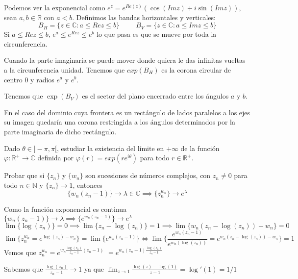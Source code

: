 \begin{sol}

Podemos ver la exponencial como $e^z = e^{Re(z)} (\cos(Imz) + i\sin(Imz))$, sean $a,b\in\mathbb{R}$ con $a<b$.
Definimos las bandas horizontales y verticales:
$$B_H = \{ z\in\mathbb{C} : a\leq Rez \leq b \} \hspace{1cm} B_V = \{ z\in\mathbb{C} : a\leq Imz \leq b \}$$
Si $a\leq Rez \leq b$, $e^a \leq e^{Rez} \leq e^b$
lo que pasa es que se mueve por toda la circunferencia.%

Cuando la parte imaginaria se puede mover donde quiera le das infinitas vueltas a la circunferencia unidad. Tenemos que
$exp(B_H)$ es la corona circular de centro $0$ y radios $e^a$ y $e^b$.

Tenemos que $\exp(B_V)$ es el sector del plano encerrado entre los ángulos $a$ y $b$.

En el caso del dominio cuya frontera es un rectángulo de lados paralelos a los ejes su imagen quedaría una corona restringida a los ángulos determinados por la parte imaginaria de dicho rectángulo.


\end{sol}


\begin{ejer}
	Dado $\theta\in]-\pi,\pi[$, estudiar la existencia del límite en $+\infty$ de la función $\varphi : \mathbb{R}^+\rightarrow\mathbb{C}$ definida por $\varphi(r) = exp(re^{i\theta})$ para todo $r\in\mathbb{R}^+$.
\end{ejer}



\begin{ejer}
Probar que si $\{z_n\}$ y $\{w_n\}$ son sucesiones de números complejos, con $z_n \not = 0$ para todo
$n\in \mathbb{N}$ y $\{ z_n \} \rightarrow 1$, entonces
$$ \{w_n(z_n-1)\} \rightarrow \lambda\in\mathbb{C} \implies \{ z_n^{w_n} \}\rightarrow e^{\lambda} $$
\end{ejer}

\begin{sol}

Como la función exponencial es continua
$\{ w_n (z_n-1) \} \rightarrow \lambda \implies \{ e^{w_n(z_n-1)} \} \rightarrow e^{\lambda}$
$$\lim \{ \log(z_n) \} = 0 \implies \lim \{ z_n-\log(z_n) \} = 1 \implies \lim \{ w_n(z_n-\log(z_n))-w_n \} = 0$$
$$\lim \{ z_n^{w_n} = e^{\log(z_n)-w_n} \}= \lim \{ e^{w_n (z_n-1)} \} \Longleftrightarrow \lim\{ \frac{e^{w_n(z_n-1)}}{e^{w_n (\log(z_n))}} = e^{w_n (z_n-\log(z_n))-w_n} \} = 1$$
Vemos que
$z_n^{w_n} = e^{w_n \frac{\log(z_n)}{z_n-1} (z_n-1)}$
$= e^{w_n (z_n-1) \frac{\log(z_n)}{z_n-1}}$

Sabemos que $ \frac{\log(z_n)}{z_n-1} \rightarrow 1$ ya que
$\lim_{z\rightarrow 1} \frac{\log(z)-\log(1)}{z-1} = \log'(1) = 1/1$

\end{sol}




